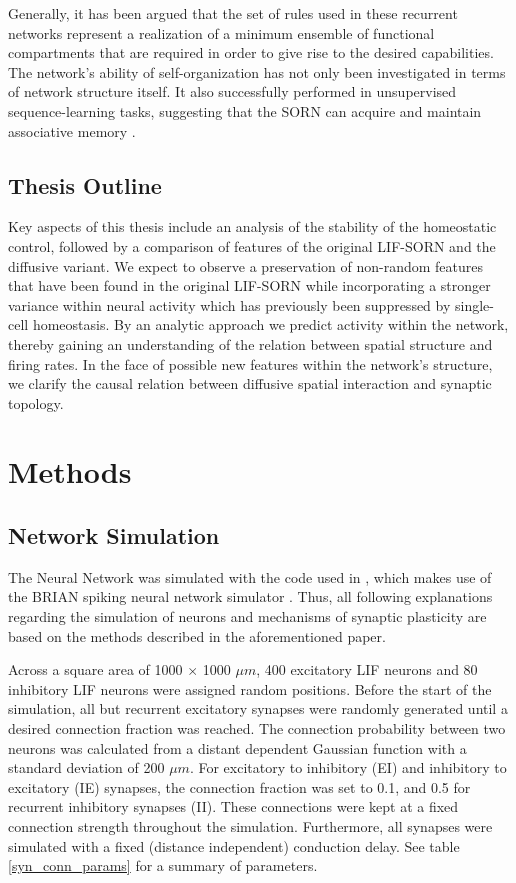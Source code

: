 \documentclass[10pt,a4paper]{article}
\begin{document}
Generally, it has been argued that the set of rules used in these recurrent networks represent a realization of a minimum ensemble of functional compartments that are required in order to give rise to the desired capabilities. The network's ability of self-organization has not only been investigated in terms of network structure itself. It also successfully performed in unsupervised sequence-learning tasks, suggesting that the SORN can acquire and maintain associative memory \cite{Hartmann_2016}.  

 
\subsection{Thesis Outline}
Key aspects of this thesis include an analysis of the stability of the homeostatic control, followed by a comparison of features of the original LIF-SORN and the diffusive variant. We expect to observe a preservation of non-random features that have been found in the original LIF-SORN while incorporating a stronger variance within neural activity which has previously been suppressed by single-cell homeostasis. By an analytic approach we predict activity within the network, thereby gaining an understanding of the relation between spatial structure and firing rates. In the face of possible new features within the network's structure, we clarify the causal relation between diffusive spatial interaction and synaptic topology.

\section{Methods} \label{methods}
\subsection{Network Simulation} \label{network simulation}

The Neural Network was simulated with the code used in \cite{SORN_Paper}, which makes use of the BRIAN spiking neural network simulator \cite{Briansim}. Thus, all following explanations regarding the simulation of neurons and mechanisms of synaptic plasticity are based on the methods described in the aforementioned paper.

Across a square area of 1000 $\times$ 1000 $\mu m$, 400 excitatory LIF neurons and 80 inhibitory LIF neurons were assigned random positions. Before the start of the simulation, all but recurrent excitatory synapses were randomly generated until a desired connection fraction was reached. The connection probability between two neurons was calculated from a distant dependent Gaussian function with a standard deviation of 200 $\mu m$. For excitatory to inhibitory (EI) and inhibitory to excitatory (IE) synapses, the connection fraction was set to 0.1, and 0.5 for recurrent inhibitory synapses (II). These connections were kept at a fixed connection strength throughout the simulation. Furthermore, all synapses were simulated with a fixed (distance independent) conduction delay. See table \ref{syn_conn_params} for a summary of parameters.
\end{document}

